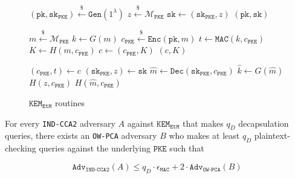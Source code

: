 \documentclass[floatrow,journal=tches,submission]{iacrtrans}
\newcommand{\pke}{\texttt{PKE}}
\newcommand{\keygen}{\texttt{Gen}}
\newcommand{\encrypt}{\texttt{Enc}}
\newcommand{\decrypt}{\texttt{Dec}}
\newcommand{\kem}{\texttt{KEM}}
\newcommand{\encap}{\texttt{Encap}}
\newcommand{\decap}{\texttt{Decap}}
\newcommand{\etm}{\texttt{EtM}}  %
\newcommand{\mac}{\texttt{MAC}}
\newcommand{\pk}{\texttt{pk}}
\newcommand{\sk}{\texttt{sk}}
\newcommand{\leftsample}{\stackrel{\$}{\leftarrow}}
\begin{document}
\begin{figure}[H]
    \center
    \begin{algorithm}[H]
        \caption{$\keygen_\etm$}\label{alg:etm-keygen}
        \begin{algorithmic}[1]
            \State $(\pk, \sk_\pke) \leftsample \keygen(1^\lambda)$
            \State $z \leftsample \mathcal{M}_\pke$
            \State $\sk \leftarrow (\sk_\pke, z)$
            \State \Return $(\pk, \sk)$
        \end{algorithmic}
    \end{algorithm}
    \begin{algorithm}[H]
        \caption{$\encap_\etm(\pk)$}\label{alg:etm-encap}
        \begin{algorithmic}[1]
            \State $m \leftsample \mathcal{M}_\pke$
            \State $k \leftarrow G(m)$
            \State $c_\pke \leftsample \encrypt(\pk, m)$
            \State $t \leftarrow \mac(k, c_\pke)$
            \State $K \leftarrow H(m, c_\pke)$
            \State $c \leftarrow (c_\pke, K)$
            \State \Return $(c, K)$
        \end{algorithmic}
    \end{algorithm}
    \begin{algorithm}[H]
        \caption{$\decap_\etm(\sk, c)$}\label{alg:etm-decap}
        \begin{algorithmic}[1]
            \State $(c_\pke, t) \leftarrow c$
            \State $(\sk_\pke, z) \leftarrow \sk$
            \State $\hat{m} \leftarrow \decrypt(\sk_\pke, c_\pke)$
            \State $\hat{k} \leftarrow G(\hat{m})$
            \If{$\mac(\hat{k}, c_\pke) \neq t$}
                \State \Return $H(z, c_\pke)$
            \EndIf
            \State \Return $H(\hat{m}, c_\pke)$
        \end{algorithmic}
    \end{algorithm}
    \caption{$\kem_\etm$ routines}\label{fig:etm-routines} 
\end{figure}

\begin{theorem}\label{thm:ow-pca-implies-kem-ind-cca2}
    For every \texttt{IND-CCA2} adversary $A$ against $\kem_\etm$ that makes $q_D$ decapsulation queries, there exists an \texttt{OW-PCA} adversary $B$ who makes at least $q_D$ plaintext-checking queries against the underlying $\pke$ such that

    \begin{equation*}
        \texttt{Adv}_\texttt{IND-CCA2}(A) \leq q_D \cdot \epsilon_\mac + 2 \cdot \texttt{Adv}_\texttt{OW-PCA}(B)
    \end{equation*}
\end{theorem}
\end{document}
